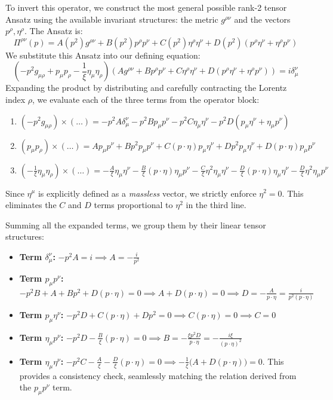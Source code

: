 To invert this operator, we construct the most general possible rank-2 tensor Ansatz using the available invariant structures: the metric $g^{\rho\nu}$ and the vectors $p^\rho, \eta^\rho$. The Ansatz is:
\[
    \Pi^{\rho\nu}(p) = A(p^2) g^{\rho\nu} + B(p^2) p^\rho p^\nu + C(p^2) \eta^\rho \eta^\nu + D(p^2) (p^\rho \eta^\nu + \eta^\rho p^\nu)
\]
We substitute this Ansatz into our defining equation:
\[
    \left( -p^2 g_{\mu\rho} + p_\mu p_\rho - \frac{1}{\xi} \eta_\mu \eta_\rho \right) \left( A g^{\rho\nu} + B p^\rho p^\nu + C \eta^\rho \eta^\nu + D (p^\rho \eta^\nu + \eta^\rho p^\nu) \right) = i \delta_\mu^\nu
\]
Expanding the product by distributing and carefully contracting the Lorentz index $\rho$, we evaluate each of the three terms from the operator block:
\begin{enumerate}
    \item $(-p^2 g_{\mu\rho}) \times (\dots) = -p^2 A \delta_\mu^\nu - p^2 B p_\mu p^\nu - p^2 C \eta_\mu \eta^\nu - p^2 D (p_\mu \eta^\nu + \eta_\mu p^\nu)$
    \item $(p_\mu p_\rho) \times (\dots) = A p_\mu p^\nu + B p^2 p_\mu p^\nu + C (p \cdot \eta) p_\mu \eta^\nu + D p^2 p_\mu \eta^\nu + D (p \cdot \eta) p_\mu p^\nu$
    \item $\left( -\frac{1}{\xi} \eta_\mu \eta_\rho \right) \times (\dots) = -\frac{A}{\xi} \eta_\mu \eta^\nu - \frac{B}{\xi} (p \cdot \eta) \eta_\mu p^\nu - \frac{C}{\xi} \eta^2 \eta_\mu \eta^\nu - \frac{D}{\xi} (p \cdot \eta) \eta_\mu \eta^\nu - \frac{D}{\xi} \eta^2 \eta_\mu p^\nu$
\end{enumerate}
Since $\eta^\mu$ is explicitly defined as a \textit{massless} vector, we strictly enforce $\eta^2 = 0$. This eliminates the $C$ and $D$ terms proportional to $\eta^2$ in the third line.

Summing all the expanded terms, we group them by their linear tensor structures:
\begin{itemize}
    \item \textbf{Term $\delta_\mu^\nu$:} $-p^2 A = i \implies A = -\frac{i}{p^2}$
    \item \textbf{Term $p_\mu p^\nu$:} $-p^2 B + A + B p^2 + D(p \cdot \eta) = 0 \implies A + D(p \cdot \eta) = 0 \implies D = -\frac{A}{p \cdot \eta} = \frac{i}{p^2 (p \cdot \eta)}$
    \item \textbf{Term $p_\mu \eta^\nu$:} $-p^2 D + C(p \cdot \eta) + D p^2 = 0 \implies C(p \cdot \eta) = 0 \implies C = 0$
    \item \textbf{Term $\eta_\mu p^\nu$:} $-p^2 D - \frac{B}{\xi}(p \cdot \eta) = 0 \implies B = -\frac{\xi p^2 D}{p \cdot \eta} = -\frac{i \xi}{(p \cdot \eta)^2}$
    \item \textbf{Term $\eta_\mu \eta^\nu$:} $-p^2 C - \frac{A}{\xi} - \frac{D}{\xi}(p \cdot \eta) = 0 \implies -\frac{1}{\xi} \big( A + D(p \cdot \eta) \big) = 0$. This provides a consistency check, seamlessly matching the relation derived from the $p_\mu p^\nu$ term.
\end{itemize}

